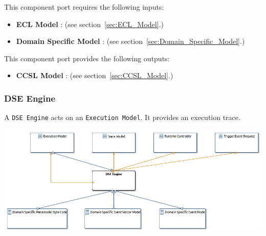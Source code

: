 \documentclass{gemoc} %
\begin{document}
This component port requires the following inputs:
\begin{itemize}
  \item \textbf{ECL Model} :
(see section~\ref{sec:ECL_Model}.)
  \item \textbf{Domain Specific Model} :
(see section~\ref{sec:Domain_Specific_Model}.)
\end{itemize}

This component port provides the following outputs:
\begin{itemize}
  \item \textbf{CCSL Model} :
(see section~\ref{sec:CCSL_Model}.)
\end{itemize}



\subsubsection{DSE Engine}
\label{sec:DSE_Engine}
A \texttt{DSE Engine} acts on an \texttt{Execution Model}.
It provides an execution trace.
\begin{center}
\includegraphics*[trim=0.0cm 0.0cm 0cm 0.0cm, clip=true]{../images/generated/Generated_DSE_Engine.png}
\end{center}
\end{document}
